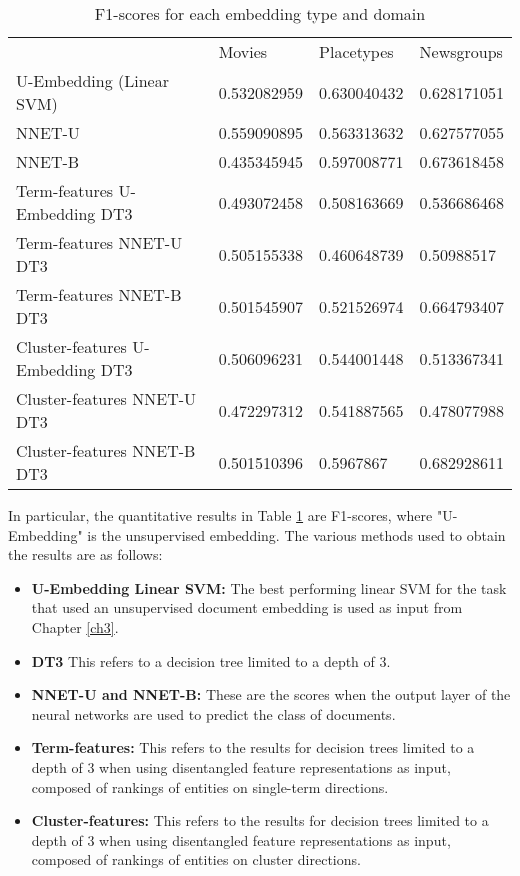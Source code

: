 \begin{table}[]
\begin{tabular}{llll}
	& Movies      & Placetypes  & Newsgroups  \\
	U-Embedding (Linear SVM)   & 0.532082959 & 0.630040432 & 0.628171051 \\
	NNET-U                      & 0.559090895 & 0.563313632 & 0.627577055 \\
	NNET-B                      & 0.435345945 & 0.597008771 & 0.673618458 \\
	Term-features U-Embedding DT3 & 0.493072458 & 0.508163669 & 0.536686468 \\
	Term-features NNET-U DT3       & 0.505155338 & 0.460648739 & 0.50988517  \\
	Term-features NNET-B DT3       & 0.501545907 & 0.521526974 & 0.664793407 \\
	Cluster-features U-Embedding DT3   & 0.506096231 & 0.544001448 & 0.513367341 \\
	Cluster-features NNET-U DT3         & 0.472297312 & 0.541887565 & 0.478077988 \\
	Cluster-features NNET-B DT3         & 0.501510396 & 0.5967867   & 0.682928611
\end{tabular}\caption{F1-scores for each embedding type and domain}\label{ch5:quantresults}
\end{table}

In particular, the quantitative results in Table \ref{ch5:quantresults} are F1-scores, where "U-Embedding" is the unsupervised embedding. The various methods used to obtain the results are as follows:

\begin{itemize}
	\item \textbf{U-Embedding Linear SVM:} The best performing linear SVM for the task that used an unsupervised document embedding is used as input  from Chapter \ref{ch3}.
	\item \textbf{DT3} This refers to a decision tree limited to a depth of 3.
	\item \textbf{NNET-U and NNET-B:} These are the scores when the output layer of the neural networks are used to predict the class of documents. 
	\item \textbf{Term-features:} This refers to the results for decision trees limited to a depth of 3 when using  disentangled feature representations as input, composed of rankings of entities on single-term directions.
	\item \textbf{Cluster-features:} This refers to the results for decision trees limited to a depth of 3 when using  disentangled feature representations as input, composed of rankings of entities on cluster directions.
\end{itemize}

